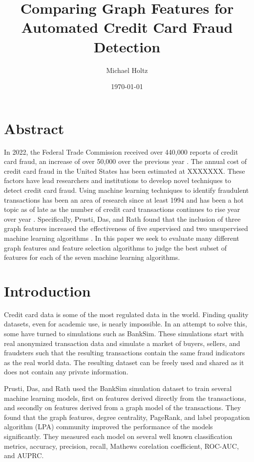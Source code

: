 \documentclass{article}
\title{Comparing Graph Features for Automated Credit Card Fraud Detection}
\author{Michael Holtz}
\date{\today}
\begin{document}
\maketitle

\section{Abstract}
In 2022, the Federal Trade Commission received over 440,000 reports of credit card fraud, an increase of over 50,000 over the previous year \cite{ftc2021,ftc2022}. The annual cost of credit card fraud in the United States has been estimated at XXXXXXX. These factors have lead researchers and institutions to develop novel techniques to detect credit card fraud. Using machine learning techniques to identify fraudulent transactions has been an area of research since at least 1994 and has been a hot topic as of late as the number of credit card transactions continues to rise year over year \cite{1994, Federal_Reserve_2023}. Specifically, Prusti, Das, and Rath found that the inclusion of three graph features increased the effectiveness of five supervised and two unsupervised machine learning algorithms \cite{graphdb}. In this paper we seek to evaluate many different graph features and feature selection algorithms to judge the best subset of features for each of the seven machine learning algorithms. 
\section{Introduction}
Credit card data is some of the most regulated data in the world. Finding quality datasets, even for academic use, is nearly impossible. In an attempt to solve this, some have turned to simulations such as BankSim\cite{Banksim}. These simulations start with real anonymized transaction data and simulate a market of buyers, sellers, and fraudsters such that the resulting transactions contain the same fraud indicators as the real world data. The resulting dataset can be freely used and shared as it does not contain any private information. 

Prusti, Das, and Rath used the BankSim simulation dataset to train several machine learning models, first on features derived directly from the transactions, and secondly on features derived from a graph model of the transactions. They found that the graph features, degree centrality, PageRank, and label propagation algorithm (LPA) community improved the performance of the models significantly. They measured each model on several well known classification metrics, accuracy, precision, recall, Mathews corelation coefficient, ROC-AUC, and AUPRC. 
\end{document}
